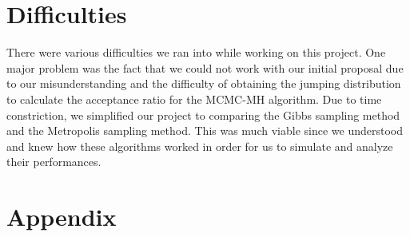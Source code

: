 \documentclass[11pt,a4paper]{article}
\begin{document}

\section*{Difficulties}
There were various difficulties we ran into while working on this project. One major problem was the fact that we could not work with our initial proposal due to our misunderstanding and the difficulty of obtaining the jumping distribution to calculate the acceptance ratio for the MCMC-MH algorithm. Due to time constriction, we simplified our project to comparing the Gibbs sampling method and the Metropolis sampling method. This was much viable since we understood and knew how these algorithms worked in order for us to simulate and analyze their performances. 


\newpage

\section*{Appendix}

\end{document}
